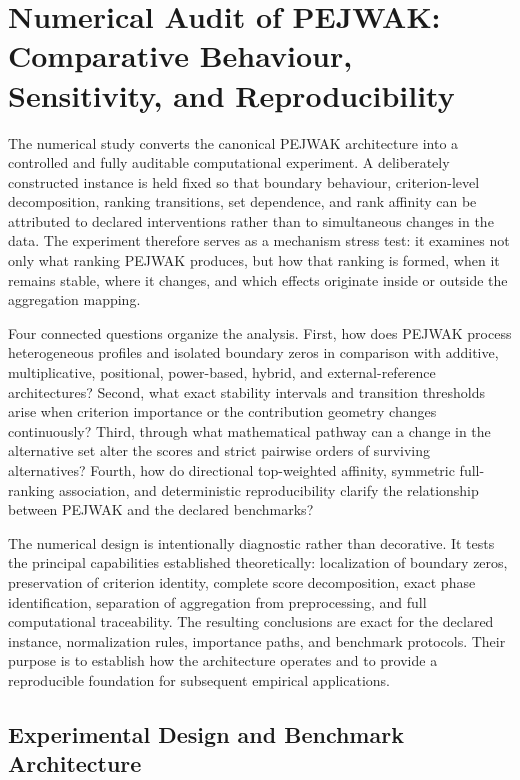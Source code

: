\documentclass[reqno,11pt]{amsart}
\theoremstyle{definition}
\theoremstyle{plain}
\theoremstyle{remark}
\begin{document}
\section{Numerical Audit of PEJWAK: Comparative Behaviour, Sensitivity,
and Reproducibility}
\label{sec:numerical-study}

The numerical study converts the canonical PEJWAK architecture into a
controlled and fully auditable computational experiment. A deliberately
constructed instance is held fixed so that boundary behaviour,
criterion-level decomposition, ranking transitions, set dependence, and
rank affinity can be attributed to declared interventions rather than to
simultaneous changes in the data. The experiment therefore serves as a
mechanism stress test: it examines not only what ranking PEJWAK produces,
but how that ranking is formed, when it remains stable, where it changes,
and which effects originate inside or outside the aggregation mapping.

Four connected questions organize the analysis. First, how does PEJWAK
process heterogeneous profiles and isolated boundary zeros in comparison
with additive, multiplicative, positional, power-based, hybrid, and
external-reference architectures? Second, what exact stability intervals
and transition thresholds arise when criterion importance or the
contribution geometry changes continuously? Third, through what
mathematical pathway can a change in the alternative set alter the scores
and strict pairwise orders of surviving alternatives? Fourth, how do
directional top-weighted affinity, symmetric full-ranking association,
and deterministic reproducibility clarify the relationship between
PEJWAK and the declared benchmarks?

The numerical design is intentionally diagnostic rather than decorative.
It tests the principal capabilities established theoretically:
localization of boundary zeros, preservation of criterion identity,
complete score decomposition, exact phase identification, separation of
aggregation from preprocessing, and full computational traceability.
The resulting conclusions are exact for the declared instance,
normalization rules, importance paths, and benchmark protocols. Their
purpose is to establish how the architecture operates and to provide a
reproducible foundation for subsequent empirical applications.

\subsection{Experimental Design and Benchmark Architecture}
\label{subsec:data-architecture}
\end{document}
